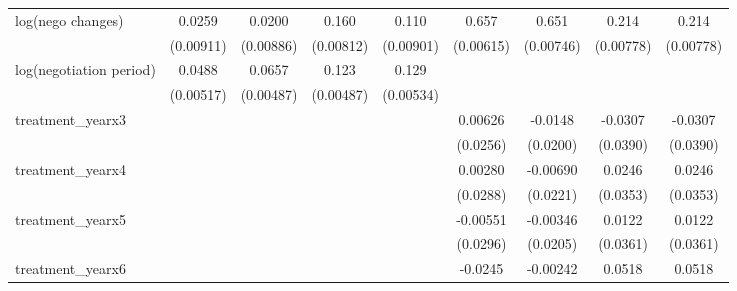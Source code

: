 {\begin{tabular}{l*{8}{c}}
\addlinespace
log(nego changes)&      0.0259\sym{***}&      0.0200\sym{**} &       0.160\sym{***}&       0.110\sym{***}&       0.657\sym{***}&       0.651\sym{***}&       0.214\sym{***}&       0.214\sym{***}\\
            &   (0.00911)         &   (0.00886)         &   (0.00812)         &   (0.00901)         &   (0.00615)         &   (0.00746)         &   (0.00778)         &   (0.00778)         \\
\addlinespace
log(negotiation period)&      0.0488\sym{***}&      0.0657\sym{***}&       0.123\sym{***}&       0.129\sym{***}&                     &                     &                     &                     \\
            &   (0.00517)         &   (0.00487)         &   (0.00487)         &   (0.00534)         &                     &                     &                     &                     \\
\addlinespace
treatment\_yearx3&                     &                     &                     &                     &     0.00626         &     -0.0148         &     -0.0307         &     -0.0307         \\
            &                     &                     &                     &                     &    (0.0256)         &    (0.0200)         &    (0.0390)         &    (0.0390)         \\
\addlinespace
treatment\_yearx4&                     &                     &                     &                     &     0.00280         &    -0.00690         &      0.0246         &      0.0246         \\
            &                     &                     &                     &                     &    (0.0288)         &    (0.0221)         &    (0.0353)         &    (0.0353)         \\
\addlinespace
treatment\_yearx5&                     &                     &                     &                     &    -0.00551         &    -0.00346         &      0.0122         &      0.0122         \\
            &                     &                     &                     &                     &    (0.0296)         &    (0.0205)         &    (0.0361)         &    (0.0361)         \\
\addlinespace
treatment\_yearx6&                     &                     &                     &                     &     -0.0245         &    -0.00242         &      0.0518         &      0.0518         \\

\end{tabular}}
